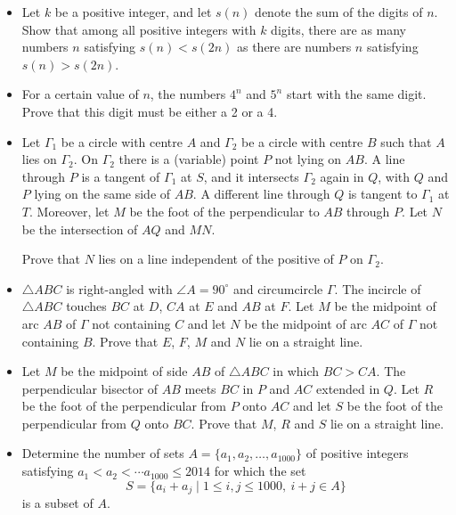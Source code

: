\documentclass[12pt]{article}
\begin{document}
\begin{itemize}
\item %
Let $k$ be a positive integer, and let $s(n)$ denote the sum of the digits of $n$. Show that among all positive integers with $k$ digits, there are as many numbers $n$ satisfying $s(n)<s(2n)$ as there are numbers $n$ satisfying $s(n)>s(2n)$.


\item %
For a certain value of $n$, the numbers $4^n$ and $5^n$ start with the same digit. Prove that this digit must be either a 2 or a 4.


\item %
Let $\Gamma_1$ be a circle with centre $A$ and $\Gamma_2$ be a circle with centre $B$ such that $A$ lies on $\Gamma_2$. On $\Gamma_2$ there is a (variable) point $P$ not lying on $AB$. A line through $P$ is a tangent of $\Gamma_1$ at $S$, and it intersects $\Gamma_2$ again in $Q$, with $Q$ and $P$ lying on the same side of $AB$. A different line through $Q$ is tangent to $\Gamma_1$ at $T$. Moreover, let $M$ be the foot of the perpendicular to $AB$ through $P$. Let $N$ be the intersection of $AQ$ and $MN$. 
	
Prove that $N$ lies on a line independent of the positive of $P$ on $\Gamma_2$.


\item %
$\triangle ABC$ is right-angled with $\angle A=90^\circ$ and circumcircle $\Gamma$. The incircle of $\triangle ABC$ touches $BC$ at $D$, $CA$ at $E$ and $AB$ at $F$. Let $M$ be the midpoint of arc $AB$ of $\Gamma$ not containing $C$ and let $N$ be the midpoint of arc $AC$ of $\Gamma$ not containing $B$. Prove that $E$, $F$, $M$ and $N$ lie on a straight line.


\item %
Let $M$ be the midpoint of side $AB$ of $\triangle ABC$ in which $BC>CA$. The perpendicular bisector of $AB$ meets $BC$ in $P$ and $AC$ extended in $Q$. Let $R$ be the foot of the perpendicular from $P$ onto $AC$ and let $S$ be the foot of the perpendicular from $Q$ onto $BC$. Prove that $M$, $R$ and $S$ lie on a straight line.


\item %
Determine the number of sets $A=\{a_1,a_2,\ldots, a_{1000}\}$ of positive integers satisfying $a_1<a_2<\cdots a_{1000}\le 2014$ for which the set
	\[ S = \{a_i+a_j\mid 1\le i,j\le 1000,\ i+j\in A\} \]
is a subset of $A$.


\end{itemize}

\vfill

\centering
\begin{BVerbatim}
\end{BVerbatim}
\end{document}
